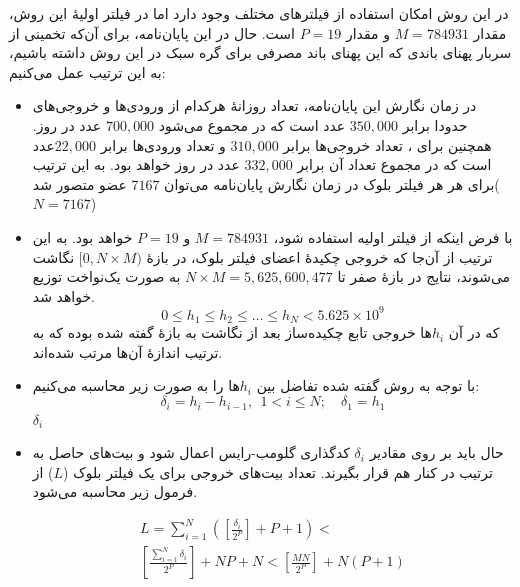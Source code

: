  در این روش امکان استفاده از فیلتر‌های مختلف وجود دارد اما در فیلتر اولیهٔ این روش، مقدار $M=784931$ و مقدار $P=19$ است. حال در این پایان‌نامه، برای آن‌که تخمینی از سربار پهنای باندی که این  پهنای باند مصرفی برای گره سبک در این روش داشته باشیم، به این ترتیب عمل می‌کنیم:
 \begin{itemize}
 	\item {%
 در زمان نگارش این پایان‌نامه، تعداد روزانهٔ هرکدام از ورودی‌ها و خروجی‌های  حدودا برابر $350,000$ عدد است که در مجموع می‌شود $700,000$ عدد در روز. همچنین برای ، تعداد خروجی‌ها برابر $310,000$ و تعداد ورودی‌ها برابر $22,000$عدد است
 که در مجموع تعداد آن برابر $332,000$ عدد در روز خواهد بود.
به این ترتیب برای هر هر فیلتر بلوک در زمان نگارش پایان‌نامه می‌توان $7167$ عضو متصور شد($N=7167$)
}
\item{%
با فرض اینکه از فیلتر اولیه استفاده شود، $M=784931$ و $P=19$ خواهد بود. به این ترتیب از آن‌‌جا که خروجی چکیدهٔ اعضای فیلتر بلوک، در بازهٔ 
$[0, N\times M)$
نگاشت می‌شوند، نتایج در بازهٔ صفر تا 
$N\times M = 5,625,600,477$
به صورت یک‌نواخت توزیع خواهد شد.\\
\begin{equation}
\label{eq:Items_in_block_filter}
0\le h_1 \leq h_2 \leq \dots \leq h_N < 5.625 \times 10^{9}
\end{equation}
که در آن $h_i$ها خروجی تابع چکیده‌ساز بعد از نگاشت به بازهٔ گفته شده بوده که به ترتیب اندازهٔ آن‌ها مرتب شده‌اند.
}
\item{%
با توجه به روش گفته شده تفاضل بین $h_i$ها را به صورت زیر محاسبه می‌کنیم:
\begin{equation}
\label{eq:delta_value_in_block_filter}
\delta_i = h_i - h_{i-1}, \ \  1<i\leq N; \quad \delta_1 = h_1
\end{equation}
}$ \delta_i $
\item{%
حال باید بر روی مقادیر $ \delta_i $ کدگذاری گلومب-رایس اعمال شود و بیت‌های حاصل به ترتیب در کنار هم قرار بگیرند. تعداد بیت‌های خروجی برای یک فیلتر بلوک ($L$) از فرمول زیر محاسبه می‌شود.



\begin{multline}
\label{eq:size_in_block_filter}
L = \sum_{i=1}^{N} \left(\left[\frac{\delta_i}{2^P}\right] + P + 1\right) < \\
\left[\frac{\sum_{i=1}^{N} \delta_i }{2^P}\right] + NP + N  <
\left[\frac{ MN }{2^P}\right] + N(P + 1) 
\end{multline}

}
\end{itemize}
